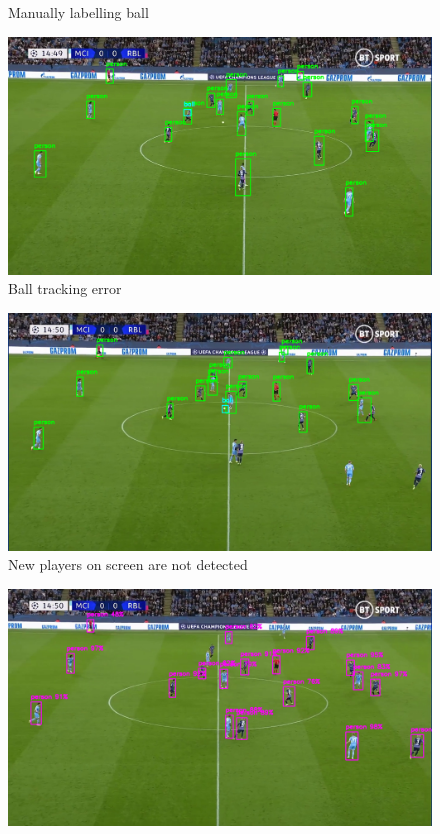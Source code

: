 \documentclass[
    11pt,
    twoside
]{report}
\begin{document}
\begin{appendices}
\begin{figure}[H]
    \caption{Manually labelling ball}
    \label{img:2}
\end{figure}
\begin{figure}[H]
    \includegraphics[keepaspectratio, width=\columnwidth]{Screenshot_2022-03-03_21-35-39.png}
    \caption{Ball tracking error}
    \label{img:3}
\end{figure}
\begin{figure}[H]
    \includegraphics[keepaspectratio, width=\columnwidth]{Screenshot_2022-03-03_21-36-05.png}
    \caption{New players on screen are not detected}
    \label{img:4}
\end{figure}
\begin{figure}[H]
    \includegraphics[keepaspectratio, width=\columnwidth]{Screenshot_2022-03-03_21-38-04.png}

\end{figure}
\end{appendices}
\end{document}
